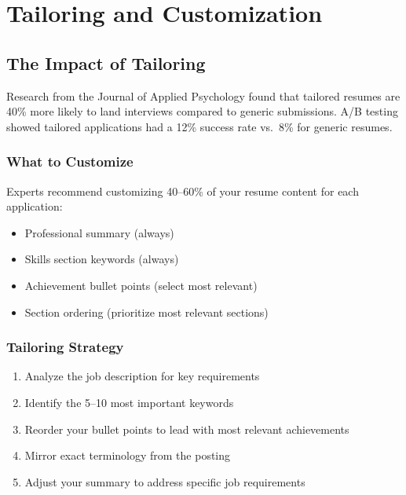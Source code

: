 \documentclass[11pt,a4paper]{article}
\begin{document}
\section{Tailoring and Customization}

\subsection{The Impact of Tailoring}

\begin{keystat}
Research from the Journal of Applied Psychology found that tailored resumes are 40\% more likely to land interviews compared to generic submissions. A/B testing showed tailored applications had a 12\% success rate vs.\ 8\% for generic resumes.
\end{keystat}

\subsubsection{What to Customize}

Experts recommend customizing 40--60\% of your resume content for each application:
\begin{itemize}
    \item Professional summary (always)
    \item Skills section keywords (always)
    \item Achievement bullet points (select most relevant)
    \item Section ordering (prioritize most relevant sections)
\end{itemize}

\subsubsection{Tailoring Strategy}

\begin{enumerate}
    \item Analyze the job description for key requirements
    \item Identify the 5--10 most important keywords
    \item Reorder your bullet points to lead with most relevant achievements
    \item Mirror exact terminology from the posting
    \item Adjust your summary to address specific job requirements
\end{enumerate}
\end{document}
